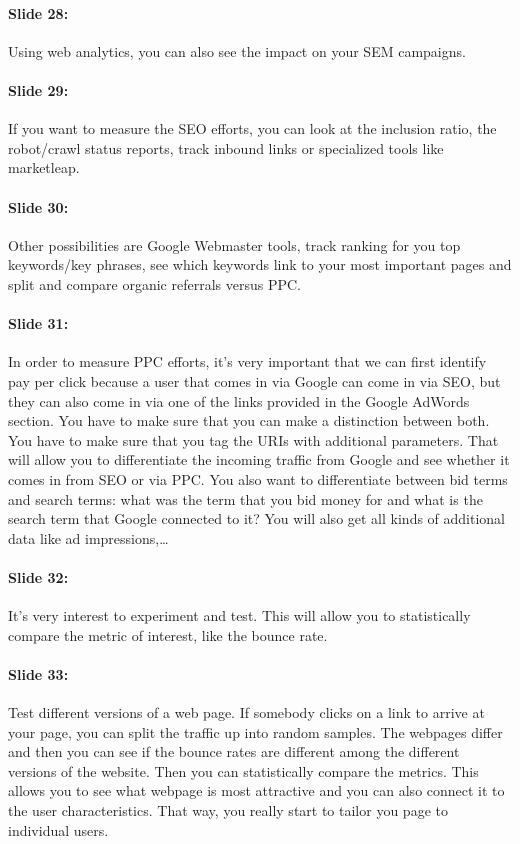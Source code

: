 \documentclass[10pt,a4paper]{report}
\begin{document}
\paragraph{Slide 28:}Using web analytics, you can also see the impact on your SEM campaigns.

\paragraph{Slide 29:}If you want to measure the SEO efforts, you can look at the inclusion ratio, the robot/crawl status reports, track inbound links or specialized tools like marketleap.

\paragraph{Slide 30:}Other possibilities are Google Webmaster tools, track ranking for you top keywords/key phrases, see which keywords link to your most important pages and split and compare organic referrals versus PPC. 

\paragraph{Slide 31:}In order to measure PPC efforts, it's very important that we can first identify pay per click because a user that comes in via Google can come in via SEO, but they can also come in via one of the links provided in the Google AdWords section. You have to make sure that you can make a distinction between both. You have to make sure that you tag the URIs with additional parameters. That will allow you to differentiate the incoming traffic from Google and see whether it comes in from SEO or via PPC. 
You also want to differentiate between bid terms and search terms: what was the term that you bid money for and what is the search term that Google connected to it? You will also get all kinds of additional data like ad impressions,… 

\paragraph{Slide 32:}It's very interest to experiment and test. This will allow you to statistically compare the metric of interest, like the bounce rate. 

\paragraph{Slide 33:}Test different versions of a web page. If somebody clicks on a link to arrive at your page, you can split the traffic up into random samples. The webpages differ and then you can see if the bounce rates are different among the different versions of the website. Then you can statistically compare the metrics. This allows you to see what webpage is most attractive and you can also connect it to the user characteristics. That way, you really start to tailor you page to individual users.
\end{document}
